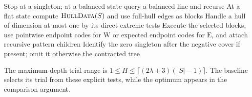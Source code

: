 \begin{algorithm}[H]
\caption{Internal graded continuation for the quasipolynomial algorithm}
\label{alg:qp-baselines}
Stop at a singleton; at a balanced state query a balanced line and recurse\;
At a flat state compute $\textnormal{\textsc{HullData}}(S)$ and use full-hull edges as blocks\;
Handle a hull of dimension at most one by its direct extreme tests\;
Execute the selected blocks, use pointwise endpoint codes for $\mathrm W$
or expected endpoint codes for $\mathrm E$, and attach recursive pattern children\;
Identify the zero singleton after the negative cover if present; omit it otherwise\;
\KwRet the contracted tree\;
\end{algorithm}

The maximum-depth trial range is
$1\le H\le\lceil(2\lambda+3)(|S|-1)\rceil$.
The baseline selects its trial from these explicit tests, while the
optimum appears in the comparison argument.
